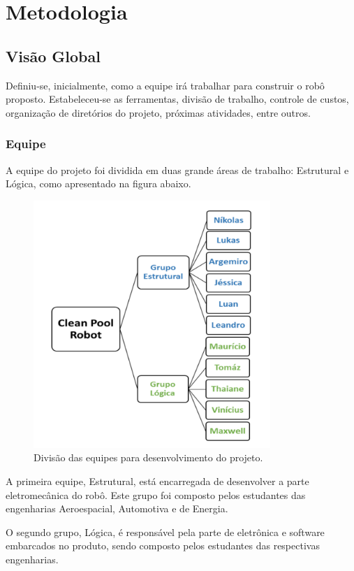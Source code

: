 \chapter{Metodologia}
\section{Visão Global}
Definiu-se, inicialmente, como a equipe irá trabalhar para construir o robô proposto. Estabeleceu-se as ferramentas, divisão de trabalho, controle de custos, organização de diretórios do projeto, próximas atividades, entre outros.

\subsection{Equipe}
A equipe do projeto foi dividida em duas grande áreas de trabalho: Estrutural e Lógica, como apresentado na figura abaixo.

\begin{figure}[h]
    \centering
    \includegraphics[width=0.8\textwidth]{figures/equipe.png}
    \caption{Divisão das equipes para desenvolvimento do projeto.}
    \label{fig:schema-way-robot}
  \end{figure}
  
\par A primeira equipe, Estrutural, está encarregada de desenvolver a parte eletromecânica do robô. Este grupo foi composto pelos estudantes das engenharias Aeroespacial, Automotiva e de Energia. 
\par O segundo grupo, Lógica, é responsável pela parte de eletrônica e software embarcados no produto, sendo composto pelos estudantes das respectivas engenharias.


